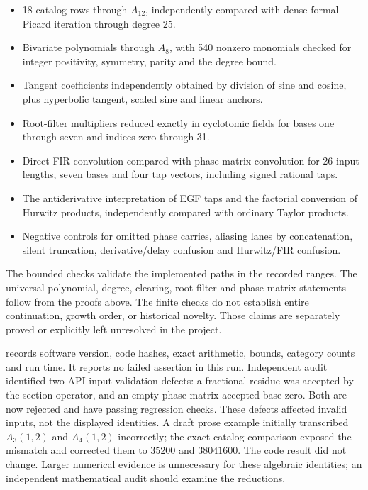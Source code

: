 \begin{itemize}
\tightlist
\item
  18 catalog rows through \(A_{12}\), independently compared with dense
  formal Picard iteration through degree 25.
\item
  Bivariate polynomials through \(A_8\), with 540 nonzero monomials
  checked for integer positivity, symmetry, parity and the degree bound.
\item
  Tangent coefficients independently obtained by division of sine and
  cosine, plus hyperbolic tangent, scaled sine and linear anchors.
\item
  Root-filter multipliers reduced exactly in cyclotomic fields for bases
  one through seven and indices zero through 31.
\item
  Direct FIR convolution compared with phase-matrix convolution for 26
  input lengths, seven bases and four tap vectors, including signed
  rational taps.
\item
  The antiderivative interpretation of EGF taps and the factorial
  conversion of Hurwitz products, independently compared with ordinary
  Taylor products.
\item
  Negative controls for omitted phase carries, aliasing lanes by
  concatenation, silent truncation, derivative/delay confusion and
  Hurwitz/FIR confusion.
\end{itemize}

The bounded checks validate the implemented paths in the recorded
ranges. The universal polynomial, degree, clearing, root-filter and
phase-matrix statements follow from the proofs above. The finite checks
do not establish entire continuation, growth order, or historical
novelty. Those claims are separately proved or explicitly left
unresolved in the project.

 records software version,
code hashes, exact arithmetic, bounds, category counts and run time. It
reports no failed assertion in this run. Independent audit identified
two API input-validation defects: a fractional residue was accepted by
the section operator, and an empty phase matrix accepted base zero. Both
are now rejected and have passing regression checks. These defects
affected invalid inputs, not the displayed identities. A draft prose
example initially transcribed \(A_3(1,2)\) and \(A_4(1,2)\) incorrectly;
the exact catalog comparison exposed the mismatch and corrected them to
\(35200\) and \(38041600\). The code result did not change. Larger
numerical evidence is unnecessary for these algebraic identities; an
independent mathematical audit should examine the reductions.
